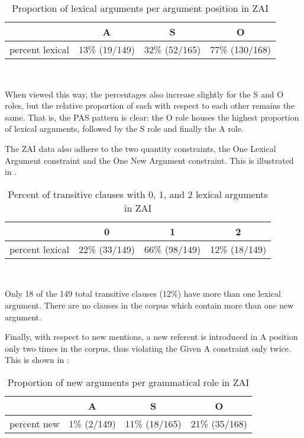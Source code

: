 \begin{table}[htp]
\begin{center}
\caption{\small{Proportion of lexical arguments per argument position in ZAI}}
\begin{tabular}{| r | c | c | c |}\hline
 & A & S & O \\
\hline
 percent lexical  &  13{\%} (19/149) &  32{\%} (52/165) &  77{\%} (130/168)  \\
  \hline
\end{tabular}\\
\label{proportionlexical}
\end{center}
\end{table}
When viewed this way, the percentages also increase slightly for the S and O roles, but the relative proportion of each with respect to each other remains the same. That is, the PAS pattern is clear: the O role houses the highest proportion of lexical arguments, followed by the S role and finally the A role.

The ZAI data also adhere to the two quantity constraints, the One Lexical Argument constraint and the One New Argument constraint. This is illustrated in .
\begin{table} [htp] 
\begin{center}
\caption{\small{Percent of transitive clauses with 0, 1, and 2 lexical arguments in ZAI}}
\begin{tabular}{| r | c | c | c |}\hline
 & 0  & 1  & 2 \\
\hline
percent lexical & 22{\%} (33/149) & 66{\%} (98/149) &  12{\%} (18/149)  \\
  \hline
\end{tabular}\\
\label{percenttrans}
\end{center}
\end{table}
Only 18 of the 149 total transitive clauses (12{\%}) have more than one lexical argument. There are no clauses in the corpus which contain more than one new argument. 

Finally, with respect to new mentions, a new referent is introduced in A position only two times in the corpus, thus violating the Given A constraint only twice. This is shown in :

\begin{table}[htp]
\begin{center}
\caption{\small{Proportion of new arguments per grammatical role in ZAI}}
\begin{tabular}{| r | c | c | c |}\hline
 & A & S & O \\
\hline
 percent new  &  1{\%} (2/149) &  11{\%} (18/165) & 21{\%} (35/168) \\
  \hline
\end{tabular}\\
\label{proportionnew}
\end{center}
\end{table}

